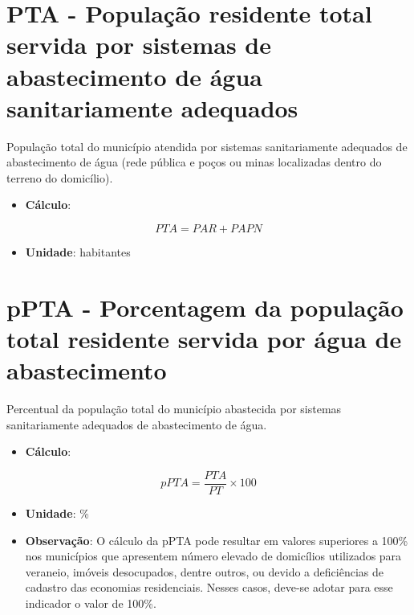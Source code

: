 \documentclass[]{book}
\providecommand{\tightlist}{%
  \setlength{\itemsep}{0pt}\setlength{\parskip}{0pt}}
\begin{document}
\hypertarget{pta---populauxe7uxe3o-residente-total-servida-por-sistemas-de-abastecimento-de-uxe1gua-sanitariamente-adequados}{%
\section*{PTA - População residente total servida por sistemas de abastecimento de água sanitariamente adequados}\label{pta---populauxe7uxe3o-residente-total-servida-por-sistemas-de-abastecimento-de-uxe1gua-sanitariamente-adequados}}

População total do município atendida por sistemas sanitariamente adequados de abastecimento de água (rede pública e poços ou minas localizadas dentro do terreno do domicílio).

\begin{itemize}
\tightlist
\item
  \textbf{Cálculo}:
\end{itemize}

\[
PTA = PAR + PAPN
\]

\begin{itemize}
\tightlist
\item
  \textbf{Unidade}: habitantes
\end{itemize}

\hypertarget{ppta---porcentagem-da-populauxe7uxe3o-total-residente-servida-por-uxe1gua-de-abastecimento}{%
\section*{pPTA - Porcentagem da população total residente servida por água de abastecimento}\label{ppta---porcentagem-da-populauxe7uxe3o-total-residente-servida-por-uxe1gua-de-abastecimento}}

Percentual da população total do município abastecida por sistemas sanitariamente adequados de abastecimento de água.

\begin{itemize}
\tightlist
\item
  \textbf{Cálculo}:
\end{itemize}

\[
pPTA =\frac{PTA}{PT} \times 100
\]

\begin{itemize}
\item
  \textbf{Unidade}: \%
\item
  \textbf{Observação}: O cálculo da pPTA pode resultar em valores superiores a 100\% nos municípios que apresentem número elevado de domicílios utilizados para veraneio, imóveis desocupados, dentre outros, ou devido a deficiências de cadastro das economias residenciais. Nesses casos, deve-se adotar para esse indicador o valor de 100\%.
\end{itemize}
\end{document}
